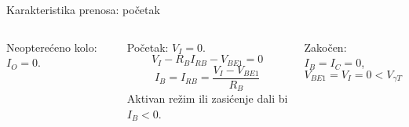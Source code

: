 \begin{frame}[label=10-s011]{Karakteristika prenosa: početak}
\setlength{\abovedisplayskip}{4pt}\setlength{\belowdisplayskip}{4pt}\setlength{\abovedisplayshortskip}{3pt}\setlength{\belowdisplayshortskip}{3pt}
\begin{columns}[T,onlytextwidth]Neopterećeno kolo: $I_O=0$.\par
Početak: $V_I=0$.
\[V_I-R_BI_{RB}-V_{BE1}=0\]
\[I_B=I_{RB}=\frac{V_I-V_{BE1}}{R_B}\]
Aktivan režim ili zasićenje dali bi $I_B<0$.\par\medskip
Zakočen: $I_B=I_C=0$,
\[V_{BE1}=V_I=0<V_{\gamma T}\]
\centering \end{columns}
\end{frame}
